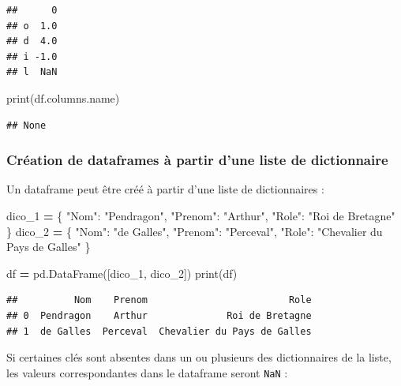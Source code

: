 \documentclass[12pt,]{book}
\newenvironment{Shaded}{\begin{snugshade}}{\end{snugshade}}
\newcommand{\StringTok}[1]{\textcolor[rgb]{0.31,0.60,0.02}{#1}}
\newcommand{\OperatorTok}[1]{\textcolor[rgb]{0.81,0.36,0.00}{\textbf{#1}}}
\newcommand{\BuiltInTok}[1]{#1}
\newcommand{\NormalTok}[1]{#1}
\numberwithin{equation}{section}
\numberwithin{countremarque}{section}
\begin{document}
\begin{lstlisting}
##      0
## o  1.0
## d  4.0
## i -1.0
## l  NaN
\end{lstlisting}

\begin{Shaded}
\begin{Highlighting}[]
\BuiltInTok{print}\NormalTok{(df.columns.name)}
\end{Highlighting}
\end{Shaded}

\begin{lstlisting}
## None
\end{lstlisting}

\subsubsection{Création de dataframes à partir d'une liste de
dictionnaire}\label{creation-de-dataframes-a-partir-dune-liste-de-dictionnaire}

Un dataframe peut être créé à partir d'une liste de dictionnaires :

\begin{Shaded}
\begin{Highlighting}[]
\NormalTok{dico_1 }\OperatorTok{=}\NormalTok{ \{}
    \StringTok{"Nom"}\NormalTok{: }\StringTok{"Pendragon"}\NormalTok{,}
    \StringTok{"Prenom"}\NormalTok{: }\StringTok{"Arthur"}\NormalTok{,}
    \StringTok{"Role"}\NormalTok{: }\StringTok{"Roi de Bretagne"}
\NormalTok{\}}
\NormalTok{dico_2 }\OperatorTok{=}\NormalTok{ \{}
    \StringTok{"Nom"}\NormalTok{: }\StringTok{"de Galles"}\NormalTok{,}
    \StringTok{"Prenom"}\NormalTok{: }\StringTok{"Perceval"}\NormalTok{,}
    \StringTok{"Role"}\NormalTok{: }\StringTok{"Chevalier du Pays de Galles"}
\NormalTok{\}}

\NormalTok{df }\OperatorTok{=}\NormalTok{ pd.DataFrame([dico_1, dico_2])}
\BuiltInTok{print}\NormalTok{(df)}
\end{Highlighting}
\end{Shaded}

\begin{lstlisting}
##          Nom    Prenom                         Role
## 0  Pendragon    Arthur              Roi de Bretagne
## 1  de Galles  Perceval  Chevalier du Pays de Galles
\end{lstlisting}

Si certaines clés sont absentes dans un ou plusieurs des dictionnaires
de la liste, les valeurs correspondantes dans le dataframe seront
\texttt{NaN} :
\end{document}
